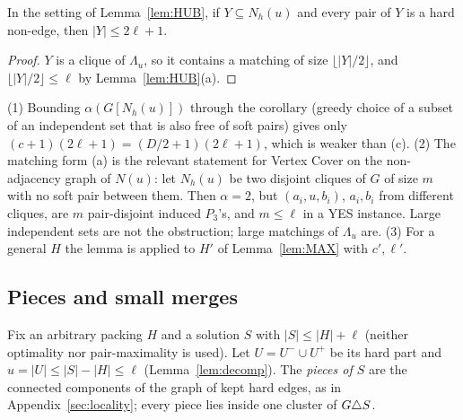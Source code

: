 \begin{corollary}\label{cor:HUB}
In the setting of Lemma~\ref{lem:HUB}, if $Y\subseteq N_h(u)$ and every pair of $Y$ is a hard non-edge, then $|Y|\le2\ell+1$.
\end{corollary}
\begin{proof}
$Y$ is a clique of $\Lambda_u$, so it contains a matching of size $\lfloor|Y|/2\rfloor$, and $\lfloor|Y|/2\rfloor\le\ell$ by Lemma~\ref{lem:HUB}(a).
\end{proof}
\begin{remark}\label{rem:hubalpha}
(1) Bounding $\alpha(G[N_h(u)])$ through the corollary (greedy choice of a subset of an independent set that is also free of soft pairs) gives only $(c+1)(2\ell+1)=(D/2+1)(2\ell+1)$, which is weaker than (c). (2) The matching form (a) is the relevant statement for Vertex Cover on the non-adjacency graph of $N(u)$: let $N_h(u)$ be two disjoint cliques of $G$ of size $m$ with no soft pair between them. Then $\alpha=2$, but $(a_i,u,b_i)$, $a_i,b_i$ from different cliques, are $m$ pair-disjoint induced $P_3$'s, and $m\le\ell$ in a YES instance. Large independent sets are not the obstruction; large matchings of $\Lambda_u$ are. (3) For a general $H$ the lemma is applied to $H'$ of Lemma~\ref{lem:MAX} with $c',\ell'$.
\end{remark}


\subsection{Pieces and small merges}
Fix an arbitrary packing $H$ and a solution $S$ with $|S|\le|H|+\ell$ (neither optimality nor pair-maximality is used). Let $U=U^-\cup U^+$ be its hard part and $u=|U|\le|S|-|H|\le\ell$ (Lemma~\ref{lem:decomp}). The \emph{pieces of $S$} are the connected components of the graph of kept hard edges, as in Appendix~\ref{sec:locality}; every piece lies inside one cluster of $G\triangle S$.

